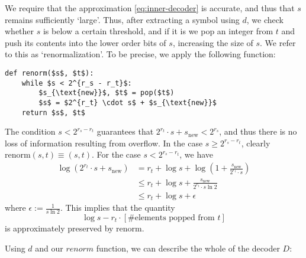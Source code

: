 \documentclass{article}
\begin{document}
We require that the approximation \cref{eq:inner-decoder} is accurate, and thus
that $s$ remains sufficiently `large'. Thus, after extracting a symbol using
$d$, we check whether $s$ is below a certain threshold, and if it is we pop an
integer from $t$ and push its contents into the lower order bits of $s$,
increasing the size of $s$. We refer to this as `renormalization'.  To be
precise, we apply the following function:

\begin{lstlisting}
def renorm($s$, $t$):
    while $s < 2^{r_s - r_t}$:
        $s_{\text{new}}$, $t$ = pop($t$)
        $s$ = $2^{r_t} \cdot s$ + $s_{\text{new}}$
    return $s$, $t$
\end{lstlisting}

The condition $s < 2^{r_s - r_t}$ guarantees that $2^{r_t} \cdot s +
s_{\text{new}} < 2^{r_s}$, and thus there is no loss of information resulting
from overflow. In the case $s \geq 2^{r_s - r_t}$, clearly $\text{renorm}(s, t)
\equiv (s, t)$. For the case $s < 2^{r_s - r_t}$, we have
\begin{align}
        \log (2^{r_t} \cdot s + s_\text{new})
        &= r_t + \log s + \log\left(1 + \frac{s_\text{new}}{2^{r_t} \cdot
                s}\right)\\
        &\leq r_t + \log s + \frac{s_\text{new}}{2^{r_t} \cdot s\ln 2}\\
        &\leq r_t + \log s + \epsilon
\end{align}
where $\epsilon := \frac{1}{s\ln 2}$. This implies that the quantity
\begin{equation}
\log s - r_t\cdot\left[\text{\# elements popped from $t$}\right]
\end{equation}
is approximately preserved by renorm.

Using $d$ and our $renorm$ function, we can describe the whole of the decoder
$D$:
\end{document}
